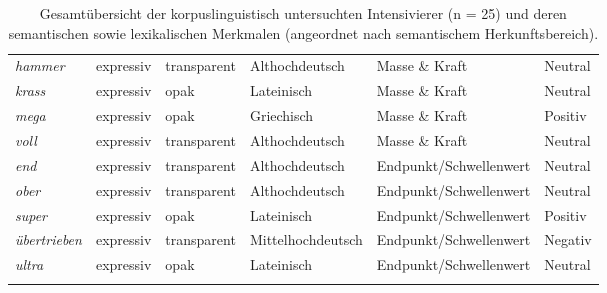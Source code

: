 \begin{table}
\begin{tabular}{llllll}
\rowcolor[gray]{.90}
\textit{hammer} & expressiv & transparent & Althochdeutsch & Masse \& Kraft & Neutral\\		
\textit{krass} & expressiv & opak & Lateinisch & Masse \& Kraft & Neutral\\			
\rowcolor[gray]{.90}
\textit{mega} & expressiv & opak & Griechisch & Masse \& Kraft & Positiv\\
\textit{voll} & expressiv & transparent & Althochdeutsch & Masse \& Kraft & Neutral\\	
\rowcolor[gray]{.90}	
\textit{end} & expressiv & transparent & Althochdeutsch & Endpunkt/Schwellenwert & Neutral \\			
\textit{ober} & expressiv & transparent & Althochdeutsch & Endpunkt/Schwellenwert & Neutral\\ 
\rowcolor[gray]{.90}  		 	
\textit{super} & expressiv & opak & Lateinisch & Endpunkt/Schwellenwert & Positiv\\ 					
\textit{übertrieben} & expressiv & transparent & Mittelhochdeutsch & Endpunkt/Schwellenwert & Negativ\\  
\rowcolor[gray]{.90}	
\textit{ultra} & expressiv & opak & Lateinisch & Endpunkt/Schwellenwert & Neutral\\
\lspbottomrule
\end{tabular}
\caption[Gesamtübersicht der korpuslinguistisch untersuchten Intensivierer]{Gesamtübersicht der korpuslinguistisch untersuchten Intensivierer (n = 25) und deren semantischen sowie lexikalischen Merkmalen (angeordnet nach semantischem Herkunftsbereich).}
\label{tab:Int}

\end{table}


